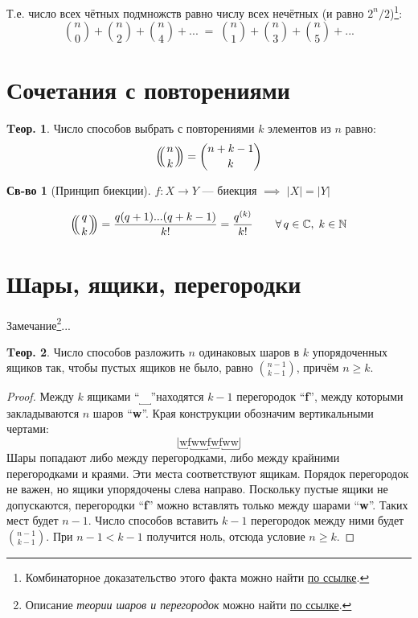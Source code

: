 \documentclass[a4paper,12pt]{article}
\numberwithin{figure}{section}
\theoremstyle{definition}
\newtheorem*{property}{Св-во}  %
\theoremstyle{definition}
\newtheorem{theorem}{Tеор.}[section]
\begin{document}
Т.е. число всех чётных подмножств равно числу всех нечётных (и равно $2^n / 2$)\footnote{ Комбинаторное доказательство этого факта можно найти \href{http://acadclasses.narod.ru/math/lecture9.htm}{по ссылке}. }:
\[
	\binom{n}{0} + \binom{n}{2} + \binom{n}{4} + ...
	\; = \;
	\binom{n}{1} + \binom{n}{3} + \binom{n}{5} + ...
\]




\section{Сочетания с повторениями}

\newcommand{\mbinom}[2] {
	\left( \!\! \middle( \genfrac{}{}{0pt}{}{#1}{#2} \middle) \!\! \right)
}

\begin{theorem}
	Число способов выбрать с повторениями $k$ элементов из $n$ равно:
	\[ \mbinom{n}{k} = \binom{n+k-1}{k} \]
\end{theorem}

\begin{property}[Принцип биекции]
	$f: X \rightarrow Y$ --- биекция $\implies$ $|X|=|Y|$
\end{property}

\[
	\mbinom{q}{k} = \frac{ q(q+1)...(q+k-1) }{k!} = \frac{ q^{(k)} }{k!}
	\qquad \forall\, q\in\mathbb{C},\; k\in\mathbb{N}
\]



\section{Шары, ящики, перегородки}

Замечание\footnote{ Описание \textit{теории шаров и перегородок} можно найти \href{http://acadclasses.narod.ru/math/lecture9.htm}{по ссылке}. }...

\def\jjc{``$\underbracket{\quad}$''}
\def\jjf{``\textbf{f}''}
\def\jjw{``\textbf{w}''}
\def\iif{\mathrm{f}}
\def\iiw{\mathrm{w}}

\begin{theorem}
	Число способов разложить $n$ одинаковых шаров в $k$ упорядоченных ящиков так, чтобы пустых ящиков не было, равно $\binom{n-1}{k-1}$, причём $n \geqslant k$.
\end{theorem}
\begin{proof}
	Между $k$ ящиками \jjc находятся $k-1$ перегородок \jjf, между которыми закладываются $n$ шаров \jjw. Края конструкции обозначим вертикальными чертами: \[ \big|
		\underbracket{\iiw} \iif \underbracket{\iiw\iiw} \iif 
		\underbracket{\iiw} \iif \underbracket{\iiw\iiw}
	\big| \]
	Шары попадают либо между перегородками, либо между крайними перегородками и краями. Эти места соответствуют ящикам.
	Порядок перегородок не важен, но ящики упорядочены слева направо.
	Поскольку пустые ящики не допускаются, перегородки \jjf \; можно вставлять только между шарами \jjw. Таких мест будет $n-1$. Число способов вставить $k-1$ перегородок между ними будет $\binom{n-1}{k-1}$. При $n-1 < k-1$ получится ноль, отсюда условие $n \geqslant k$.
\end{proof}
\end{document}

